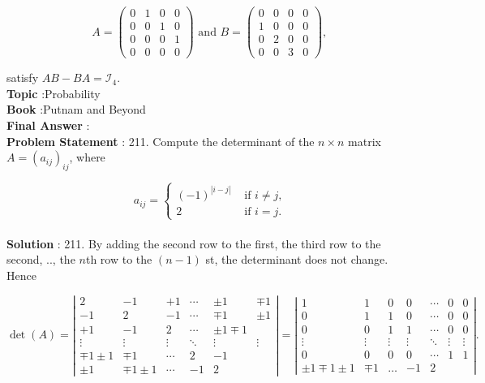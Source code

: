 \documentclass[10pt]{article}
\begin{document}
$$
A=\left(\begin{array}{llll}
0 & 1 & 0 & 0 \\
0 & 0 & 1 & 0 \\
0 & 0 & 0 & 1 \\
0 & 0 & 0 & 0
\end{array}\right) \text { and } B=\left(\begin{array}{llll}
0 & 0 & 0 & 0 \\
1 & 0 & 0 & 0 \\
0 & 2 & 0 & 0 \\
0 & 0 & 3 & 0
\end{array}\right) \text {, }
$$

satisfy $A B-B A=\mathcal{I}_{4}$.
\\
\textbf{Topic} :Probability\\
\textbf{Book} :Putnam and Beyond\\
\textbf{Final Answer} :\\


\textbf{Problem Statement} :
211. Compute the determinant of the $n \times n$ matrix $A=\left(a_{i j}\right)_{i j}$, where

$$
a_{i j}= \begin{cases}(-1)^{|i-j|} & \text { if } i \neq j, \\ 2 & \text { if } i=j .\end{cases}
$$
\\
\textbf{Solution} :
211. By adding the second row to the first, the third row to the second, .., the $n$th row to the $(n-1)$ st, the determinant does not change. Hence

$$
\operatorname{det}(A)=\left|\begin{array}{rrrrrr}
2 & -1 & +1 & \cdots & \pm 1 & \mp 1 \\
-1 & 2 & -1 & \cdots & \mp 1 & \pm 1 \\
+1 & -1 & 2 & \cdots & \pm 1 \mp 1 \\
\vdots & \vdots & \vdots & \ddots & \vdots & \vdots \\
\mp 1 \pm 1 & \mp 1 & \cdots & 2 & -1 \\
\pm 1 & \mp 1 \pm 1 & \cdots & -1 & 2
\end{array}\right|=\left|\begin{array}{ccccccc}
1 & 1 & 0 & 0 & \cdots & 0 & 0 \\
0 & 1 & 1 & 0 & \cdots & 0 & 0 \\
0 & 0 & 1 & 1 & \cdots & 0 & 0 \\
\vdots & \vdots & \vdots & \vdots & \ddots & \vdots & \vdots \\
0 & 0 & 0 & 0 & \cdots & 1 & 1 \\
\pm 1 \mp 1 \pm 1 & \mp 1 & \ldots & -1 & 2
\end{array}\right| .
$$
\end{document}
